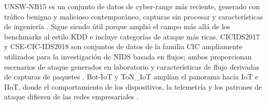 UNSW-NB15 es un conjunto de datos de cyber-range más reciente, generado con tráfico benigno y malicioso contemporáneo, capturas sin procesar y características de ingeniería \parencite{MoustafaSlay2015UNSWNB15,Moustafa2016UNSWEval}. Sigue siendo útil porque amplió el campo más allá de los benchmarks al estilo KDD e incluye categorías de ataque más ricas. CICIDS2017 y CSE-CIC-IDS2018 son conjuntos de datos de la familia CIC ampliamente utilizados para la investigación de NIDS basada en flujos; ambos proporcionan escenarios de ataque generados en laboratorio y características de flujo derivadas de capturas de paquetes \parencite{Sharafaldin2018CICIDS2017,CSECICIDS2018AWS}. Bot-IoT y ToN\_IoT amplían el panorama hacia IoT e IIoT, donde el comportamiento de los dispositivos, la telemetría y los patrones de ataque difieren de las redes empresariales \parencite{Koroniotis2019BotIoT,Moustafa2020ToNIoT,Alsaedi2020ToNIoT}.

